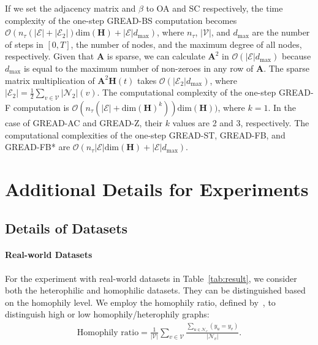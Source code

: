 \documentclass{article}
\theoremstyle{plain}
\theoremstyle{definition}
\theoremstyle{remark}
\begin{document}
If we set the adjacency matrix and $\beta$ to OA and SC respectively, the time complexity of the one-step GREAD-BS computation becomes $\mathcal{O}(n_{\tau}(|\mathcal{E}|+|\mathcal{E}_2|)\text{dim}(\mathbf{H}) + |\mathcal{E}|d_{\text{max}})$, where $n_{\tau}$, $|\mathcal{V}|$, and $d_{\text{max}}$ are the number of steps in $[0,T]$, the number of nodes, and the maximum degree of all nodes, respectively. Given that $\mathbf{A}$ is sparse, we can calculate $\mathbf{A}^2$ in $\mathcal{O}(|\mathcal{E}|d_{\text{max}})$ because $d_{\text{max}}$ is equal to the maximum number of non-zeroes in any row of $\mathbf{A}$. The sparse matrix multiplication of $\mathbf{A}^2 \mathbf{H}(t)$ takes $\mathcal{O}(|\mathcal{E}_2|d_{\text{max}})$, where $|\mathcal{E}_2|=\frac{1}{2}\sum_{v\in\mathcal{V}}|\mathcal{N}_2|(v)$.
The computational complexity of the one-step GREAD-F computation is $\mathcal{O}(n_{\tau}(|\mathcal{E}|+\text{dim}(\mathbf{H})^k))\text{dim}(\mathbf{H}))$, where $k=1$. In the case of GREAD-AC and GREAD-Z, their $k$ values are 2 and 3, respectively. The computational complexities of the one-step GREAD-ST, GREAD-FB, and GREAD-FB* are $\mathcal{O}(n_{\tau}|\mathcal{E}|\text{dim}(\mathbf{H}) + |\mathcal{E}|d_{\text{max}})$. 


\section{Additional Details for Experiments}\label{a:details}
\subsection{Details of Datasets}

\paragraph{Real-world Datasets}
For the experiment with real-world datasets in Table~\ref{tab:result}, we consider both the heterophilic and homophilic datasets. They can be distinguished based on the homophily level. We employ the homophily ratio, defined by~\cite{pei2020geomGCN}, to distinguish high or low homophily/heterophily graphs:
\begin{align}
    \text{Homophily ratio}=\frac{1}{|\mathcal{V}|}\sum_{v\in\mathcal{V}}\frac{\sum_{u \in \mathcal{N}_v}(y_u=y_v)}{|\mathcal{N}_v|}.
\end{align}
\end{document}

